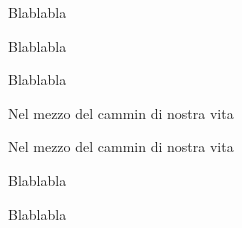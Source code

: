 \documentclass{book}
\begin{document}
\beginnumbering
\numberpstarttrue
\pstart
Blablabla
\pend

\pstart
Blablabla
\pend

\pstart
Blablabla
\pend

\pausenumbering
\begin{pairs}
\begin{Leftside}
\resumenumbering
\numberpstartfalse
\pstart
Nel mezzo del cammin di nostra vita
\pend
\pausenumbering
\end{Leftside}

\begin{Rightside}
\beginnumbering
\numberpstartfalse
\pstart
Nel mezzo del cammin di nostra vita
\pend
\endnumbering
\end{Rightside}
\end{pairs}
\Columns
\numberpstarttrue
\resumenumbering

\pstart
Blablabla
\pend

\pstart
Blablabla
\pend

\numberpstartfalse
\endnumbering
\end{document}
